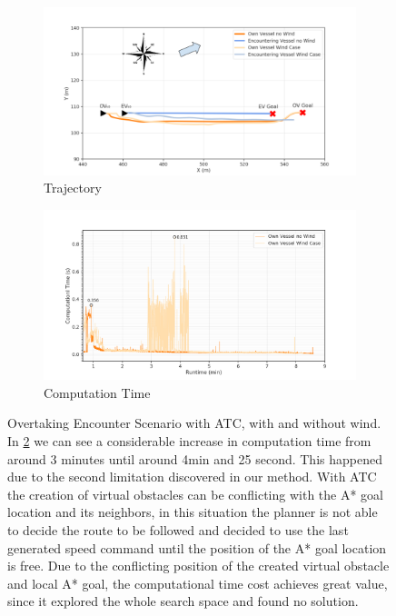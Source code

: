 \begin{figure}[H]
            \begin{subfigure}[b]{0.49\textwidth}
                \centering
                \includegraphics[width=\textwidth]{figs/Chap5/plot_ov_w_vs_wind.png}
                \caption{Trajectory}
                \label{fig:plot_ov_w_vs_wind}
            \end{subfigure}
            \begin{subfigure}[b]{0.49\textwidth}
                \centering
                \includegraphics[width=\textwidth]{figs/Chap5/plot_ov_w_vs_wind_CT.png}
                \caption{Computation Time}
                \label{fig:plot_ov_w_vs_wind_CT}
            \end{subfigure}
        
        \caption{Overtaking Encounter Scenario with \ac{ATC}, with and without wind. In \ref{fig:plot_ov_w_vs_wind_CT} we can see a considerable increase in computation time from around 3 minutes until around 4min and 25 second. This happened due to the second limitation discovered in our method. With \ac{ATC} the creation of virtual obstacles can be conflicting with the A* goal location and its neighbors, in this situation the planner is not able to decide the route to be followed and decided to use the last generated speed command until the position of the A* goal location is free. Due to the conflicting position of the created virtual obstacle and local A* goal, the computational time cost achieves great value, since it explored the whole search space and found no solution.}
        \label{fig:plots_ov}
        \end{figure}
        
